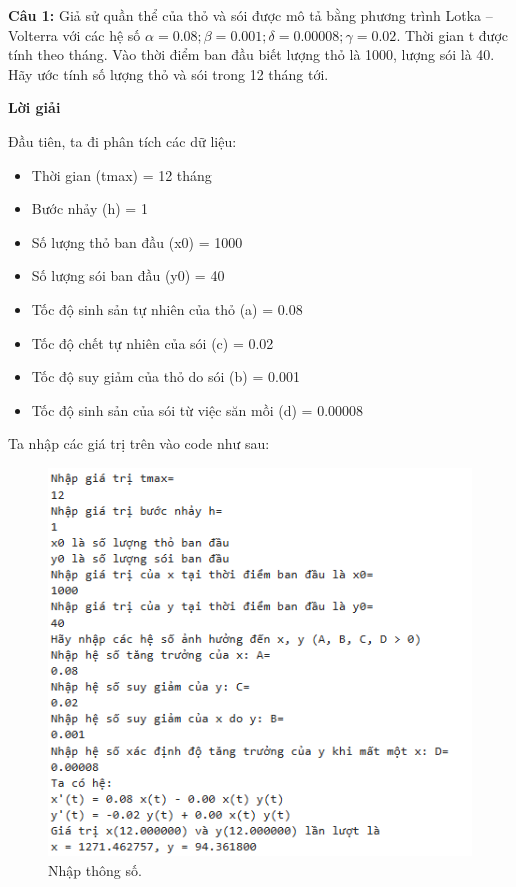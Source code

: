 \documentclass[a4paper,15pt]{article}
\begin{document}
\textbf{Câu 1: }Giả sử quần thể của thỏ và sói được mô tả bằng phương trình Lotka – Volterra với các hệ số $\alpha = 0.08; \beta = 0.001; \delta = 0.00008; \gamma = 0.02.$ Thời gian t được tính theo tháng. Vào thời điểm ban đầu biết lượng thỏ là 1000, lượng sói là 40. Hãy ước tính số lượng thỏ và sói trong 12 tháng tới.
\begin{center}
    \textbf{Lời giải}
\end{center}
Đầu tiên, ta đi phân tích các dữ liệu:
\begin{itemize}
    \item Thời gian (tmax) = 12 tháng
    \item Bước nhảy (h) = 1
    \item Số lượng thỏ ban đầu (x0) = 1000
    \item Số lượng sói ban đầu (y0) = 40 
    \item Tốc độ sinh sản tự nhiên của thỏ (a) = 0.08
    \item Tốc độ chết tự nhiên của sói (c) = 0.02
    \item Tốc độ suy giảm của thỏ do sói (b) = 0.001
    \item Tốc độ sinh sản của sói từ việc săn mồi (d) = 0.00008
\end{itemize}
Ta nhập các giá trị trên vào code như sau:\\
\begin{figure}[H]
    \centering
    \includegraphics[scale=0.75]{img/Nhapvao.png}
    \caption{Nhập thông số.}
    \label{fig:enter-label}
\end{figure}
\end{document}
